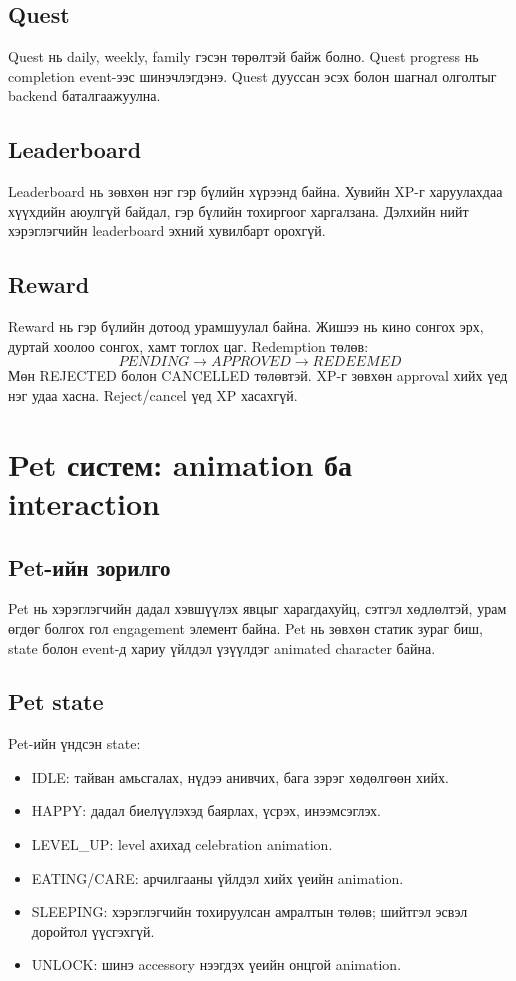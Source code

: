 \documentclass[12pt,a4paper,oneside]{report}
\begin{document}
\section{Quest}
Quest нь daily, weekly, family гэсэн төрөлтэй байж болно. Quest progress нь completion event-ээс шинэчлэгдэнэ. Quest дууссан эсэх болон шагнал олголтыг backend баталгаажуулна.

\section{Leaderboard}
Leaderboard нь зөвхөн нэг гэр бүлийн хүрээнд байна. Хувийн XP-г харуулахдаа хүүхдийн аюулгүй байдал, гэр бүлийн тохиргоог харгалзана. Дэлхийн нийт хэрэглэгчийн leaderboard эхний хувилбарт орохгүй.

\section{Reward}
Reward нь гэр бүлийн дотоод урамшуулал байна. Жишээ нь кино сонгох эрх, дуртай хоолоо сонгох, хамт тоглох цаг. Redemption төлөв:
\[
PENDING \rightarrow APPROVED \rightarrow REDEEMED
\]
Мөн REJECTED болон CANCELLED төлөвтэй. XP-г зөвхөн approval хийх үед нэг удаа хасна. Reject/cancel үед XP хасахгүй.

\chapter{Pet систем: animation ба interaction}

\section{Pet-ийн зорилго}
Pet нь хэрэглэгчийн дадал хэвшүүлэх явцыг харагдахуйц, сэтгэл хөдлөлтэй, урам өгдөг болгох гол engagement элемент байна. Pet нь зөвхөн статик зураг биш, state болон event-д хариу үйлдэл үзүүлдэг animated character байна.

\section{Pet state}
Pet-ийн үндсэн state:
\begin{itemize}
  \item IDLE: тайван амьсгалах, нүдээ анивчих, бага зэрэг хөдөлгөөн хийх.
  \item HAPPY: дадал биелүүлэхэд баярлах, үсрэх, инээмсэглэх.
  \item LEVEL\_UP: level ахихад celebration animation.
  \item EATING/CARE: арчилгааны үйлдэл хийх үеийн animation.
  \item SLEEPING: хэрэглэгчийн тохируулсан амралтын төлөв; шийтгэл эсвэл доройтол үүсгэхгүй.
  \item UNLOCK: шинэ accessory нээгдэх үеийн онцгой animation.
\end{itemize}
\end{document}
